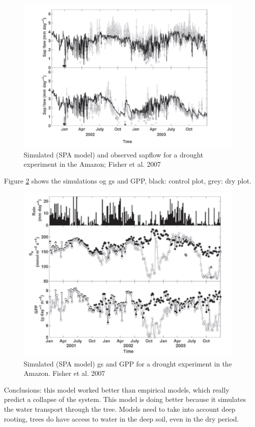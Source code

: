 \documentclass[12pt,oneside]{book}
\begin{document}
\begin{figure}

{\centering \includegraphics[width=0.8\linewidth]{figures/chap2/fisher1} 

}

\caption{Simulated (SPA model) and observed sapflow for a drought experiment in the Amazon; Fisher et al. 2007}\label{fig:f224}
\end{figure}

Figure \ref{fig:f225} shows the simulations og gs and GPP, black:
control plot, grey: dry plot.

\begin{figure}

{\centering \includegraphics[width=0.8\linewidth]{figures/chap2/fisher2} 

}

\caption{Simulated (SPA model) gs and GPP for a drought experiment in the Amazon. Fisher et al. 2007}\label{fig:f225}
\end{figure}

Conclusions: this model worked better than empirical models, which
really predict a collapse of the system. This model is doing better
because it simulates the water transport through the tree. Models need
to take into account deep rooting, trees do have access to water in the
deep soil, even in the dry period.
\end{document}
